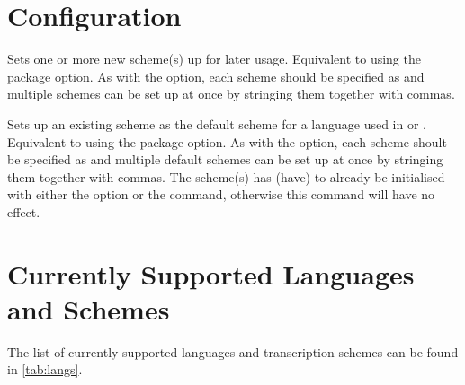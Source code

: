\documentclass{ltxdockit}
\begin{document}
\section{Configuration}

\begin{ltxsyntax}

  Sets one or more new scheme(s) up for later usage. Equivalent to using the
   package option. As with the option, each scheme should be specified as
   and multiple schemes can be set up at once by
  stringing them together with commas.


  Sets up an existing scheme as the default scheme for a language used in
   or . Equivalent
  to using the  package option. As with the option, each
  scheme shoult be specified as  and multiple
  default schemes can be set up at once by stringing them together with commas.
  The scheme(s) has (have) to already be initialised with either the
   option or the  command,
  otherwise this command will have no effect.
\end{ltxsyntax}

\section{Currently Supported Languages and Schemes}

The list of currently supported languages and transcription schemes can be found
in \autoref{tab:langs}.
\end{document}
